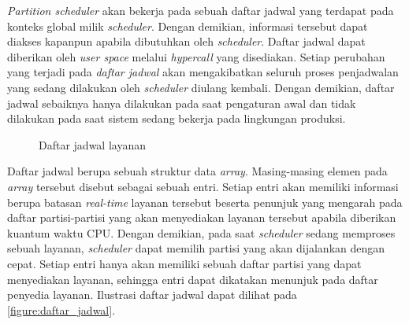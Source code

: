 \textit{Partition scheduler} akan bekerja pada sebuah daftar jadwal yang terdapat pada konteks
global milik \textit{scheduler}. Dengan demikian, informasi tersebut dapat diakses kapanpun
apabila dibutuhkan oleh \textit{scheduler}. Daftar jadwal dapat diberikan oleh \textit{user
space} melalui \textit{hypercall} yang disediakan. Setiap perubahan yang terjadi pada
\textit{daftar jadwal} akan mengakibatkan seluruh proses penjadwalan yang sedang dilakukan oleh
\textit{scheduler} diulang kembali. Dengan demikian, daftar jadwal sebaiknya hanya dilakukan
pada saat pengaturan awal dan tidak dilakukan pada saat sistem sedang bekerja pada lingkungan
produksi.

\begin{figure}[h]
	\centering

	\vspace{20pt}

	\caption{Daftar jadwal layanan}
	\label{figure:daftar_jadwal}
\end{figure}

Daftar jadwal berupa sebuah struktur data \textit{array}. Masing-masing elemen pada
\textit{array} tersebut disebut sebagai sebuah entri. Setiap entri akan memiliki informasi
berupa batasan \textit{real-time} layanan tersebut beserta penunjuk yang mengarah pada daftar
partisi-partisi yang akan menyediakan layanan tersebut apabila diberikan kuantum waktu CPU. Dengan
demikian, pada saat \textit{scheduler} sedang memproses sebuah layanan, \textit{scheduler} dapat
memilih partisi yang akan dijalankan dengan cepat. Setiap entri hanya akan memiliki sebuah
daftar partisi yang dapat menyediakan layanan, sehingga entri dapat dikatakan menunjuk pada
daftar penyedia layanan. Ilustrasi daftar jadwal dapat dilihat pada
\autoref{figure:daftar_jadwal}.


